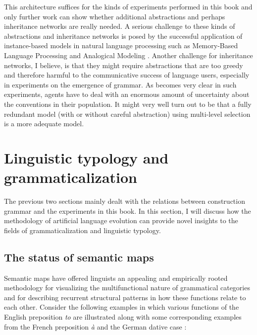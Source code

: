 This architecture suffices for the kinds of experiments performed in this book and only further work can show whether additional abstractions and perhaps inheritance networks are really needed. A serious challenge to these kinds of abstractions and inheritance networks is posed by the successful application of instance-based models in natural language processing such as Memory-Based Language Processing \citep{daelemans05memory} and Analogical Modeling \citep{skousen89analogical}. Another challenge for inheritance networks, I believe, is that they might require abstractions that are too greedy and therefore harmful to the communicative success of language users, especially in experiments on the emergence of grammar. As becomes very clear in such experiments, agents have to deal with an enormous amount of uncertainty about the conventions in their population. It might very well turn out to be that a fully redundant model (with or without careful abstraction) using multi-level selection is a more adequate model.

\section{Linguistic typology and grammaticalization}
\label{s:comp-semmaps}

The previous two sections mainly dealt with the relations between construction grammar and the experiments in this book. In this section, I will discuss how the methodology of artificial language evolution can provide novel insights to the fields of grammaticalization and linguistic typology.

\subsection{The status of semantic maps}
\label{s:semantic-maps}

Semantic maps have offered linguists an appealing and empirically rooted methodology for visualizing the multifunctional nature of grammatical categories and for describing recurrent structural patterns in how these functions relate to each other. Consider the following examples in which various functions of the English preposition {\em to} are illustrated along with some corresponding examples from the French preposition {\em à} and the German dative case \citep[taken from][example 2, p. 212 and example sentences on p. 213--215]{haspelmath03geometry}:

